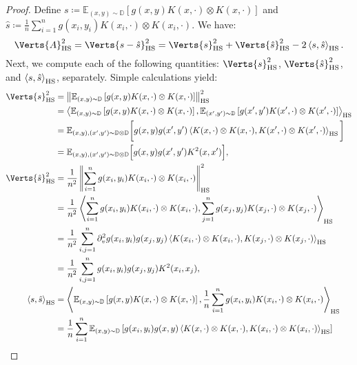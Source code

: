 \begin{proof}
{
Define $s\coloneqq\mathbb{E}_{(x,y)\sim\mathbb{D}}\left[g(x,y)K(x,\cdot)\otimes K(x,\cdot)\right]$ and $\hat{s}\coloneqq\frac{1}{n}\sum_{i=1}^n g(x_i,y_i)K(x_i,\cdot)\otimes K(x_i,\cdot)$. We have:
\begin{equation}\label{eq:A}
    \Verts{A}_{\hs}^2=\Verts{s-\hat{s}}_{\hs}^2=\Verts{s}_{\hs}^2+\Verts{\hat{s}}_{\hs}^2-2\left\langle s,\hat{s}\right\rangle_{\hs}.
\end{equation}
Next, we compute each of the following quantities: $\Verts{s}_{\hs}^2$, $\Verts{\hat{s}}_{\hs}^2$, and $\left\langle s,\hat{s}\right\rangle_{\operatorname{HS}}$, separately. Simple calculations yield:
\begin{align*}
    \Verts{s}_{\hs}^2&=\left\|\mathbb{E}_{(x,y)\sim\mathbb{D}}\left[g(x,y)K(x,\cdot)\otimes K(x,\cdot)\right]\right\|_{\hs}^2\\
    &=\left\langle\mathbb{E}_{(x,y)\sim\mathbb{D}}\left[g(x,y)K(x,\cdot)\otimes K(x,\cdot)\right],\mathbb{E}_{(x',y')\sim\mathbb{D}}\left[g(x',y')K(x',\cdot)\otimes K(x',\cdot)\right]\right\rangle_{\hs}\\
    &=\mathbb{E}_{(x,y),(x',y')\sim\mathbb{D}\otimes\mathbb{D}}\bigg[g(x,y)g(x',y')\left\langle K(x,\cdot)\otimes K(x,\cdot),K(x',\cdot)\otimes K(x',\cdot)\right\rangle_{\hs}\bigg]\\
    &=\mathbb{E}_{(x,y),(x',y')\sim\mathbb{D}\otimes\mathbb{D}}\Big[g(x,y)g(x',y')K^2(x,x')\Big],\\
    \Verts{\hat{s}}_{\hs}^2&=\frac{1}{n^2}\left\|\sum_{i=1}^n g(x_i, y_i)K(x_i,\cdot)\otimes K(x_i,\cdot)\right\|_{\hs}^2\\
    &=\frac{1}{n^2}\left\langle\sum_{i=1}^n g(x_i, y_i)K(x_i,\cdot)\otimes K(x_i,\cdot),\sum_{j=1}^n g(x_j, y_j)K(x_j,\cdot)\otimes K(x_j,\cdot)\right\rangle_{\hs}\\
    &=\frac{1}{n^2}\sum_{i,j=1}^n\partial_v^2 g(x_i, y_i)g(x_j, y_j)\left\langle K(x_i,\cdot)\otimes K(x_i,\cdot),K(x_j,\cdot)\otimes K(x_j,\cdot)\right\rangle_{\hs}\\
    &=\frac{1}{n^2}\sum_{i,j=1}^n g(x_i, y_i)g(x_j, y_j)K^2(x_i,x_j),\\
    \left\langle s,\hat{s}\right\rangle_{\hs}&=\left\langle\mathbb{E}_{(x,y)\sim\mathbb{D}}\left[g(x, y)K(x,\cdot)\otimes K(x,\cdot)\right],\frac{1}{n}\sum_{i=1}^n g(x_i, y_i)K(x_i,\cdot)\otimes K(x_i,\cdot)\right\rangle_{\hs}\\
    &=\frac{1}{n}\sum_{i=1}^n\mathbb{E}_{(x,y)\sim\mathbb{D}}\left[g(x_i, y_i)g(x, y)\left\langle K(x,\cdot)\otimes K(x,\cdot),K(x_i,\cdot)\otimes K(x_i,\cdot)\right\rangle_{\hs}\right]\\

\end{align*}}
\end{proof}
